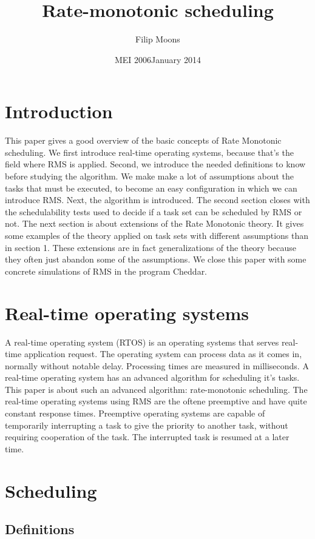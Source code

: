 \documentclass[a4paper,12pt]{article}
\author{Filip Moons}
\title{Rate-monotonic scheduling}
\date{MEI 2006}
\date{January 2014}
\theoremstyle{definition}
\begin{document}
\maketitlepage


\tableofcontents
\newpage
\section{Introduction}
This paper gives a good overview of the basic concepts of Rate Monotonic scheduling. We first introduce
real-time operating systems, because that's the field where RMS is applied. Second, we introduce the needed definitions to know before studying the algorithm.
We make make a lot of assumptions about the tasks that must be executed, to 
become an easy configuration in which we can introduce RMS.
Next, the algorithm is introduced. The second section closes with the schedulability tests used to decide if a task set can be scheduled by RMS or not.
The next section is about extensions of the Rate Monotonic theory. It gives some examples of the theory applied on task sets with different assumptions than in section 1.
These extensions are in fact generalizations of the theory because they often just abandon some of the assumptions. We close this paper with some concrete simulations of RMS in the program Cheddar. \newpage
\section{Real-time operating systems}
A real-time operating system (RTOS) is an operating systems that serves 
real-time application request. The operating system can process data as it comes 
in, normally without notable delay. Processing times are measured in 
milliseconds. A real-time operating system has an advanced algorithm for 
scheduling it's tasks. This paper is about such an advanced algorithm: 
rate-monotonic scheduling. The real-time operating systems using RMS are the 
oftene preemptive and have quite constant response times.  Preemptive operating systems are capable of temporarily interrupting a task to give the priority to another task, without requiring cooperation of the task. The interrupted task is resumed at a later time.
\newpage
\section{Scheduling}
\subsection{Definitions}
\end{document}
